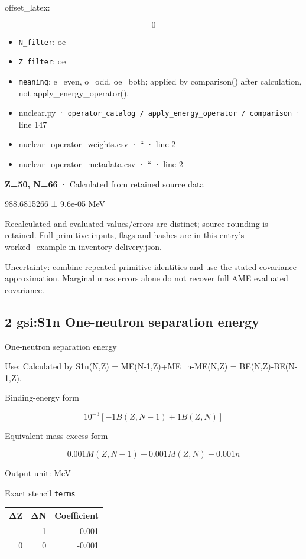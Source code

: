 \documentclass[
  11pt,
  letterpaper,
]{article}
\begin{document}
offset\_latex:

\[
0
\]

\begin{itemize}
\item
  \texttt{N\_filter}: oe
\item
  \texttt{Z\_filter}: oe
\item
  \texttt{meaning}: e=even, o=odd, oe=both; applied by comparison()
  after calculation, not apply\_energy\_operator().
\item
  nuclear.py ·
  \texttt{operator\_catalog\ /\ apply\_energy\_operator\ /\ comparison}
  · line 147
\item
  nuclear\_operator\_weights.csv · `` · line 2
\item
  nuclear\_operator\_metadata.csv · `` · line 2
\end{itemize}

\textbf{Z=50, N=66} · Calculated from retained source data

988.6815266 ± 9.6e-05 MeV

Recalculated and evaluated values/errors are distinct; source rounding
is retained. Full primitive inputs, flags and hashes are in this entry's
worked\_example in inventory-delivery.json.

Uncertainty: combine repeated primitive identities and use the stated
covariance approximation. Marginal mass errors alone do not recover full
AME evaluated covariance.

\subsection{2 gsi:S1n One-neutron separation
energy}\label{gsis1n-one-neutron-separation-energy}

One-neutron separation energy

Use: Calculated by S1n(N,Z) = ME(N-1,Z)+ME\_n-ME(N,Z) =
BE(N,Z)-BE(N-1,Z).

Binding-energy form

\[
10^{-3}[-1B(Z,N-1)+1B(Z,N)]
\]

Equivalent mass-excess form

\[
0.001M(Z,N-1)-0.001M(Z,N) + 0.001 n
\]

Output unit: MeV

Exact stencil \texttt{terms}

\begin{longtable}[]{@{}rrr@{}}
\toprule\noalign{}
ΔZ & ΔN & Coefficient \\
\midrule\noalign{}
\endhead
\bottomrule\noalign{}
\endlastfoot
0 & -1 & 0.001 \\
0 & 0 & -0.001 \\
\end{longtable}
\end{document}
